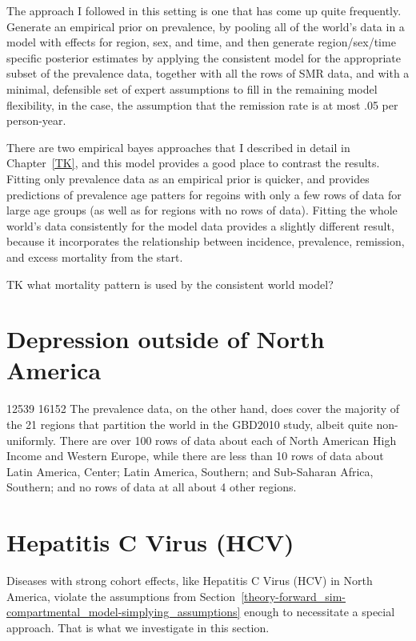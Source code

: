 The approach I followed in this setting is one that has come up quite
frequently.  Generate an empirical prior on prevalence, by pooling all
of the world's data in a model with effects for region, sex, and
time, and then generate region/sex/time specific posterior estimates
by applying the consistent model for the appropriate subset of the
prevalence data, together with all the rows of SMR data, and with a
minimal, defensible set of expert assumptions to fill in the remaining
model flexibility, in the case, the assumption that the remission rate
is at most .05 per person-year.

There are two empirical bayes approaches that I described in detail in
Chapter~\ref{TK}, and this model provides a good place to contrast the
results.  Fitting only prevalence data as an empirical prior is
quicker, and provides predictions of prevalence age patters for
regoins with only a few rows of data for large age groups (as well as
for regions with no rows of data).  Fitting the whole world's data
consistently for the model data provides a slightly different result,
because it incorporates the relationship between incidence,
prevalence, remission, and excess mortality from the start.

TK what mortality pattern is used by the consistent world model?

\section{Depression outside of North America}
12539 
16152
 The prevalence data, on the
other hand, does cover the majority of the 21 regions that partition
the world in the GBD2010 study, albeit quite non-uniformly.  There are
over 100 rows of data about each of North American High Income and
Western Europe, while there are less than 10 rows of data about Latin
America, Center; Latin America, Southern; and Sub-Saharan Africa,
Southern; and no rows of data at all about 4 other regions.

\section{Hepatitis C Virus (HCV)}
Diseases with strong cohort effects, like Hepatitis C Virus (HCV) in North
America, violate the assumptions from
Section~\ref{theory-forward_sim-compartmental_model-simplying_assumptions}
enough to necessitate a special approach.  That is what we investigate
in this section.

